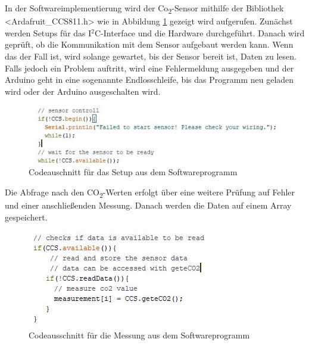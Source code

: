 In der Softwareimplementierung wird der Co\textsubscript{2}-Sensor mithilfe der Bibliothek <Ardafruit\_CCS811.h> wie in Abbildung \ref{fig:Setup} gezeigt wird aufgerufen. Zunächst werden Setups für das I$^2$C-Interface und die Hardware durchgeführt. Danach wird geprüft, ob die Kommunikation mit dem Sensor aufgebaut werden kann. Wenn das der Fall ist, wird solange gewartet, bis der Sensor bereit ist, Daten zu lesen. Falls jedoch ein Problem auftritt, wird eine Fehlermeldung ausgegeben und der Arduino geht in eine sogenannte Endlosschleife, bis das Programm neu geladen wird oder der Arduino ausgeschalten wird.

\begin{figure}[!hbt]
	\centering
	\includegraphics[width=0.9\linewidth]{Images/ccs811Setup}
	\caption{Codeauschnitt für das Setup aus dem Softwareprogramm}
	\label{fig:Setup}
\end{figure}

Die Abfrage nach den CO\textsubscript{2}-Werten erfolgt über eine weitere Prüfung auf Fehler und einer anschließenden Messung. Danach werden die Daten auf einem Array gespeichert.

\begin{figure}[!hbt]
	\centering
	\includegraphics[width=0.5\linewidth]{Images/ccs811Loop}
	\caption{Codeausschnitt für die Messung aus dem Softwareprogramm}
	\label{fig:Loop}
\end{figure}

